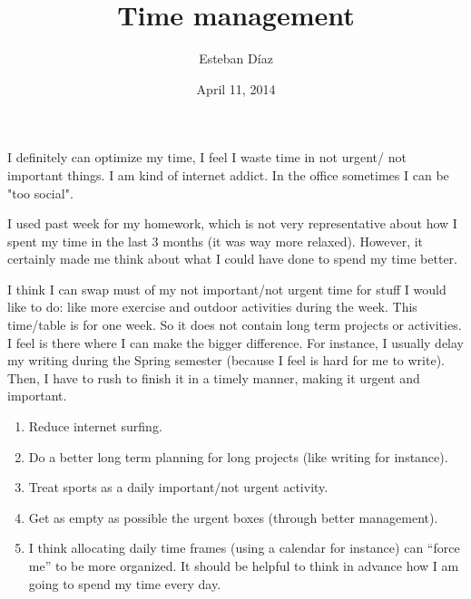 \documentclass[10pt]{article}
\author{Esteban D\'{i}az}
\title{Time management}{}
\begin{document}
\date{April 11, 2014}

\maketitle
I definitely can optimize my time, I feel I waste time in not urgent/ not important things. I 
am kind of internet addict. In the office sometimes I can be "too social".

 I used past week for my homework, which is not very representative about how I spent my time
in the last 3 months (it was way more relaxed). However, it certainly made me think about
what I could have done to spend my time better. 


I think I can swap must of my not important/not urgent time for stuff I would like to do: like
more exercise and outdoor activities during the week. This time/table is for one week. So it 
does not contain long term projects or activities. I feel is there where I can make the bigger
difference. For instance, I usually delay my writing during the Spring semester (because
I feel is hard for me to write). Then, I have to rush to finish it in a timely manner, making
it urgent and important.



\begin{enumerate}
  \item Reduce internet surfing.
  \item Do a better long term planning for long projects (like writing for instance).
  \item Treat sports as a daily important/not urgent activity. 
  \item Get as empty as possible the urgent boxes (through better management).
  \item I think allocating daily time frames (using a calendar for instance) can 
        ``force me'' to be more organized. It should be helpful to think in advance
        how I am going to spend my time every day. 
\end{enumerate}
\end{document}
